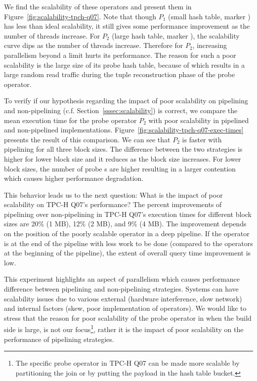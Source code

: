 We find the scalability of these operators and present them in Figure~\ref{fig:scalability-tpch-q07}.
Note that though $P_1$ (small hash table, marker {\color{PlotOrange}\FilledSmallCircle}) has less than ideal scalability, it still gives some performance improvement as the number of threads increase.
For $P_2$ (large hash table, marker {\color{PlotGreen}\FilledSmallTriangleUp}), the scalability curve dips as the number of threads increase.
Therefore for $P_2$, increasing parallelism beyond a limit hurts its performance. 
The reason for such a poor scalability is the large size of its probe hash table, because of which results in a large random read traffic during the tuple reconstruction phase of the probe operator. 

To verify if our hypothesis regarding the impact of poor scalability on pipelining and non-pipelining (c.f. Section~\ref{sssec:scalability}) is correct, we compare the mean \wo{} execution time for the probe operator $P_2$ with poor scalability in pipelined and non-pipelined implementations.
Figure~\ref{fig:scalability-tpch-q07-exec-times} presents the result of this comparison. 
We can see that $P_2$ is faster with pipelining for all three block sizes.
The difference between the two strategies is higher for lower block size and it reduces as the block size increases.
For lower block sizes, the number of probe \wo{}s are higher resulting in a larger contention which causes higher performance degradation.

This behavior leads us to the next question: What is the impact of poor scalability on TPC-H Q07's performance?
The percent improvements of pipelining over non-pipelining in TPC-H Q07's execution times for different block sizes are 20\% (1 MB), 12\% (2 MB), and 9\% (4 MB).
The improvement depends on the position of the poorly scalable operator in a deep pipeline.
If the operator is at the end of the pipeline with less work to be done (compared to the operators at the beginning of the pipeline), the extent of overall query time improvement is low. 

This experiment highlights an aspect of parallelism which causes performance difference between pipelining and non-pipelining strategies.
Systems can have scalability issues due to various external (hardware interference, slow network) and internal factors (skew, poor implementation of operators).
We would like to stress that the reason for poor scalability of the probe operator in \sys{} when the build side is large, is not our focus\footnote{The specific probe operator in TPC-H Q07 can be made more scalable by partitioning the join or by putting the payload in the hash table bucket.}, rather it is the impact of poor scalability on the performance of pipelining strategies.

